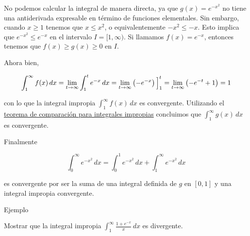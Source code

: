 \documentclass[
  letterpaper,
]{book}
\theoremstyle{plain}
\theoremstyle{remark}
\begin{document}
\begin{tcolorbox}[enhanced jigsaw, opacityback=0, left=2mm, opacitybacktitle=0.6, toprule=.15mm, bottomrule=.15mm, colbacktitle=quarto-callout-tip-color!10!white, titlerule=0mm, bottomtitle=1mm, title=\textcolor{quarto-callout-tip-color}{\faLightbulb}\hspace{0.5em}{Solución}, toptitle=1mm, colframe=quarto-callout-tip-color-frame, colback=white, breakable, rightrule=.15mm, arc=.35mm, leftrule=.75mm, coltitle=black]

No podemos calcular la integral de manera directa, ya que
\(g(x)=e^{-x^2}\) no tiene una antiderivada expresable en término de
funciones elementales. Sin embargo, cuando \(x\geq 1\) tenemos que
\(x\leq x^2\), o equivalentemente \(-x^2\leq -x\). Esto implica que
\(e^{-x^2}\leq e^{-x}\) en el intervalo \(I=[1,\infty)\). Si llamamos
\(f(x)=e^{-x}\), entonces tenemos que \(f(x)\geq g(x)\geq 0\) en \(I\).

Ahora bien,

\[
\int_1^\infty f(x)\,dx=\lim_{t\to \infty} \int_1^t e^{-x}\,dx =\lim_{t\to \infty} \left(-e^{-x}\right)\Big{]}_1^t=\lim_{t\to \infty} \left(-e^{-t}+1\right)=1
\]

con lo que la integral impropia \(\displaystyle \int_1^\infty f(x)\,dx\)
es convergente. Utilizando el \hyperref[teo-comparacion]{teorema de
comparación para integrales impropias} concluimos que
\(\displaystyle \int_1^{\infty} g(x)\,dx\) es convergente.

Finalmente

\[
\int_0^\infty e^{-x^2}\,dx=\int_0^1 e^{-x^2}\,dx+\int_1^\infty e^{-x^2}\,dx
\]

es convergente por ser la suma de una integral definida de \(g\) en
\([0,1]\) y una integral impropia convergente.

\end{tcolorbox}

Ejemplo

Mostrar que la integral impropia
\(\displaystyle \int_{1}^{\infty}\frac{1+e^{-x}}{x}\,dx\) es divergente.
\end{document}
